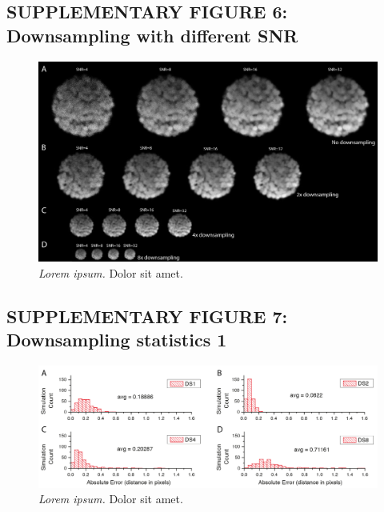 \documentclass[]{spie}  %
\begin{document}
\pagebreak



\subsection*{SUPPLEMENTARY FIGURE 6: Downsampling with different SNR}
\vspace{1mm}
\begin{figure}[h!]
\includegraphics[width=\textwidth]{fig-downsampling.png}
\vspace{-2.0mm}
\caption{\hspace{-0.5mm} \emph{Lorem ipsum.} Dolor sit amet.
}
\label{fig:sup-fig-downsampling}
\end{figure}

\pagebreak



\subsection*{SUPPLEMENTARY FIGURE 7: Downsampling statistics 1}
\vspace{1mm}
\begin{figure}[h!]
\includegraphics[width=\textwidth]{fig-downsampling-statistics-1.png}
\vspace{-2.0mm}
\caption{\hspace{-0.5mm} \emph{Lorem ipsum.} Dolor sit amet.
}
\label{fig:sup-fig-downsampling-statistics-1}
\end{figure}
\end{document}
